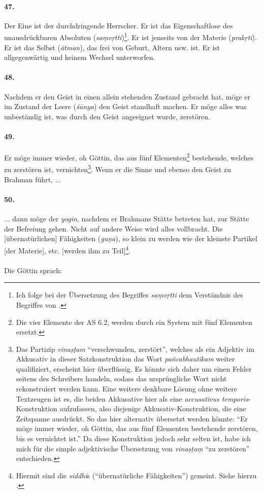 \documentclass[a4paper,12pt]{article}
\begin{document}
\paragraph{47.} Der Eine ist der durchdringende Herrscher. Er ist das Eigenschaftlose des unausdrückbaren Absoluten (\textit{saṃvṛtti})\footnote{Ich folge bei der Übersetzung des Begriffes \textit{saṃvṛtti} dem Verständnis des Begriffes von \parencite[17]{kawamura1991}.}. Er ist jenseits von der Materie (\textit{prakṛti}). Er ist das Selbst (\textit{ātman}), das frei von Geburt, Altern usw. ist. Er ist allgegenwärtig und keinem Wechsel unterworfen.

\paragraph{48.} Nachdem er den Geist in einen allein stehenden Zustand gebracht hat, möge er im Zustand der Leere (\textit{śūnya}) den Geist standhaft machen. Er möge alles was unbeständig ist, was durch den Geist angeeignet wurde, zerstören.  

\paragraph{49.} Er möge immer wieder, oh Göttin, das aus fünf Elementen\footnote{Die vier Elemente der AS 6.2, werden durch ein System mit fünf Elementen ersetzt.} bestehende, welches zu zerstören ist, vernichten\footnote{Das Partizip \textit{vinaṣṭam} ``verschwunden, zerstört'', welches als ein Adjektiv im Akkusativ in dieser Satzkonstruktion das Wort \textit{pañcabhautikam} weiter qualifiziert, erscheint hier überflüssig. Es könnte sich daher um einen Fehler seitens des Schreibers handeln, sodass das ursprüngliche Wort nicht rekonstruiert werden kann. Eine weitere denkbare Lösung ohne weitere Textzeugen ist es, die beiden Akkusative hier als eine \textit{accusativus temporis}-Konstruktion aufzufassen, also diejenige Akkusativ-Konstruktion, die eine Zeitspanne ausdrückt. So das hier alternativ übersetzt werden könnte: ``Er möge immer wieder, oh Göttin, das aus fünf Elementen bestehende zerstören, bis es vernichtet ist.'' Da diese Konstruktion jedoch sehr selten ist, habe ich mich für die simple adjektivische Übersetzung von \textit{vinaṣṭaṃ} ``zu zerstören'' entschieden. }. Wenn er die Sinne und ebenso den Geist zu Brahman führt, ...


\paragraph{50.} ... dann möge der \textit{yogin}, nachdem er Brahmans Stätte betreten hat, zur Stätte der Befreiung gehen. Nicht auf andere Weise wird alles vollbracht. Die [übernatürlichen] Fähigkeiten (\textit{guṇa}), so klein zu werden wie der kleinste Partikel [der Materie], etc. [werden ihm zu Teil]\footnote{Hiermit sind die \textit{siddhi}s (``übernatürliche Fähigkeiten'') gemeint. Siehe hierzu \parencite{yogapowers2017}.}. 
\\
\\
\noindent Die Göttin sprach:
\end{document}
